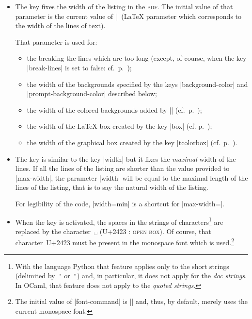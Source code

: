 \documentclass{article}
\begin{document}
\begin{itemize}
The initial value is: |gray!15|

\item {} \label{width} The key  fixes the width
of the listing in the \textsc{pdf}. The initial value of that parameter
is the current value of |\linewidth| (LaTeX parameter which corresponds to the
width of the lines of text).

That parameter is used for:
\begin{itemize}
\item the breaking the lines which are too long (except, of course, when the key
|break-lines| is set to false: cf.~p.~\pageref{line-breaks});
\item the width of the backgrounds specified by the keys |background-color| and
|prompt-background-color| described below;
\item the width of the colored backgrounds added by |\rowcolor|
(cf.~p.~\pageref{rowcolor});
\item the width of the LaTeX box created by the key |box| (cf. p.~\pageref{box});
\item the width of the graphical box created by the key |tcolorbox|
(cf.~p.~\pageref{tcolorbox}).
\end{itemize}

\item {}

The key  is similar to the key |width| but it fixes the
\emph{maximal} width of the lines. If all the lines of the listing are shorter
than the value provided to |max-width|, the parameter |width| will be equal to
the maximal length of the lines of the listing, that is to say the natural width of
the listing.

For legibility of the code, |width=min| is a shortcut for |max-width=\linewidth|.


\item {} When the key
 is activated, the spaces in the 
strings of characters\footnote{With the language Python that feature applies
only to the short strings (delimited by~\verb|'| or~\verb|"|) and, in
particular, it does not apply for the \emph{doc strings}. In OCaml, that
feature does not apply to the \emph{quoted strings}.} are replaced by the
character~␣ (U+2423 : \textsc{open box}). Of course, that character~U+2423
must be present in the monospace font which is used.\footnote{The initial
value of |font-command| is |\ttfamily| and, thus,  by default, 
merely uses the current monospace font.}


\end{itemize}
\end{document}
